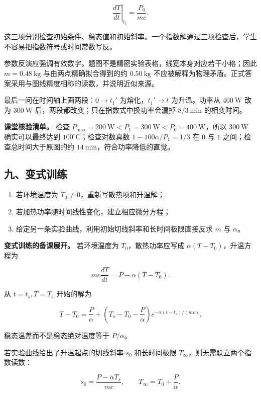 \documentclass[12pt,a4paper,UTF8]{ctexart}
\newcommand{\tightlist}{\setlength{\itemsep}{0pt}\setlength{\parskip}{0pt}}
\begin{document}
\[
\left.\frac{dT}{dt}\right|_{t_1}=\frac{P_0}{mc}.
\]

这三项分别检查初始条件、稳态值和初始斜率。一个指数解通过三项检查后，学生不容易把指数符号或时间常数写反。

参数反演应强调有效数字。题图不是精密实验表格，线宽本身对应若干小格；因此
\(m=0.48\ \mathrm{kg}\) 与由两点精确拟合得到的约 \(0.50\ \mathrm{kg}\)
不应被解释为物理矛盾。正式答案采用与图线精度相称的读数，并说明近似来源。

最后一问在时间轴上画两段：\(0\to t_1'\) 为熔化，\(t_1'\to t\)
为升温。功率从 \(400\ \mathrm W\) 改为 \(300\ \mathrm W\)
后，两段都改变；只在指数式中换功率会漏掉 \(8/3\ \mathrm{min}\)
的相变时间。

\textbf{课堂核验清单。} 检查
\(P_{\max}=200\ \mathrm W<P_1=300\ \mathrm W<P_0=400\ \mathrm W\)，所以
\(300\ \mathrm W\) 确实可以最终达到 \(100^\circ\mathrm C\)；检查对数真数
\(1-100\alpha/P_1=1/3\) 在 \(0\) 与 \(1\) 之间；检查总时间大于原图的约
\(14\ \mathrm{min}\)，符合功率降低的直觉。

\subsection{九、变式训练}\label{ux4e5dux53d8ux5f0fux8badux7ec3-7}

\begin{enumerate}
\def\labelenumi{\arabic{enumi}.}
\tightlist
\item
  若环境温度为 \(T_0\neq0\)，重新写散热项和升温解；
\item
  若加热功率随时间线性变化，建立相应微分方程；
\item
  给定另一条实验曲线，利用初始切线斜率和长时间极限直接反求 \(m\) 与
  \(\alpha\)。
\end{enumerate}

\textbf{变式训练的备课展开。} 若环境温度为 \(T_0\)，散热功率应写成
\(\alpha(T-T_0)\)，升温方程为

\[
mc\frac{dT}{dt}=P-\alpha(T-T_0).
\]

从 \(t=t_s,T=T_s\) 开始的解为

\[
T-T_0
=\frac P\alpha
+\left(T_s-T_0-\frac P\alpha\right)
e^{-\alpha(t-t_s)/(mc)}.
\]

稳态温差而不是稳态绝对温度等于 \(P/\alpha\)。

若实验曲线给出了升温起点的切线斜率 \(s_0\) 和长时间极限
\(T_\infty\)，则无需联立两个指数读数：

\[
s_0=\frac{P-\alpha T_s}{mc},
\qquad
T_\infty=T_0+\frac P\alpha.
\]
\end{document}
